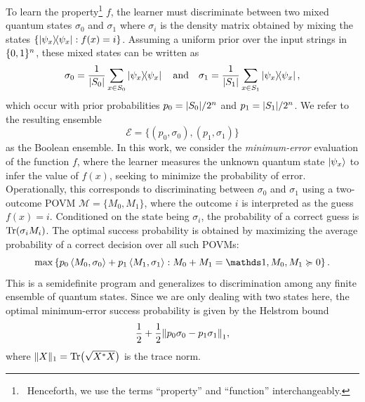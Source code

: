 To learn the property\footnote{\
    Henceforth, we use the terms ``property'' and ``function'' interchangeably.
} $f$, the learner must discriminate between two mixed quantum states $\sigma_0$ and $\sigma_1$ where $\sigma_i$ is the density matrix obtained by mixing the states $\left\{\ketbra{\psi_x}{\psi_x} : f(x) = i\right\}$.
Assuming a uniform prior over the input strings in $\{ 0, 1 \}^n$, these mixed states can be written as
\begin{equation}\label{eq:ch5_qseq-states}
    \sigma_0 = \frac{1}{\abs{S_0}} \sum_{x \in S_0} \ketbra{\psi_x}{\psi_x}
    \quad \text{and} \quad
    \sigma_1 = \frac{1}{\abs{S_1}} \sum_{x \in S_1} \ketbra{\psi_x}{\psi_x},
\end{equation}
which occur with prior probabilities $p_0 = \abs{S_0}/2^n$ and $p_1 = \abs{S_1}/2^n$.
We refer to the resulting ensemble
\begin{equation}\label{eq:ch5_qseq-boolean-ensemble}
    \mathcal{E} = \{(p_0,\sigma_0),(p_1,\sigma_1)\}
\end{equation}
as the Boolean ensemble.
In this work, we consider the \emph{minimum-error} evaluation of the function $f$, where the learner measures the unknown quantum state $\ket{\psi_x}$ to infer the value of $f(x)$, seeking to minimize the probability of error.
Operationally, this corresponds to discriminating between $\sigma_0$ and $\sigma_1$ using a two-outcome POVM $\mathcal{M} = \{ M_0, M_1 \}$, where the outcome $i$ is interpreted as the guess $f(x)=i$.
Conditioned on the state being $\sigma_i$, the probability of a correct guess is $\Tr(\sigma_i M_i)$.
The optimal success probability is obtained by maximizing the average probability of a correct decision over all such POVMs:
\begin{equation}\label{SDP:ch5_qseq-qsd}
    \max \left\{
        p_0 \inner{M_0}{\sigma_0} + p_1 \inner{M_1}{\sigma_1} : M_0 + M_1 = \id, M_0, M_1 \succcurlyeq 0
    \right\}.
\end{equation}
This is a semidefinite program and generalizes to discrimination among any finite ensemble of quantum states.
Since we are only dealing with two states here, the optimal minimum-error success probability is given by the Helstrom bound \cite{helstrom1969quantum,holevo1976investigations}
\begin{equation}\label{eq:ch5_qseq-tracenorm}
    \frac{1}{2} + \frac{1}{2} \norm*{ p_0 \sigma_0 - p_1 \sigma_1 }_{1},
\end{equation}
where $\lVert X\rVert_{1} = \Tr\bigl(\sqrt{X^*X}\bigr)$ is the trace norm.

